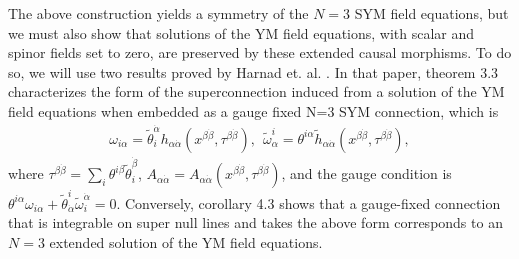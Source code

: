 \documentclass[12pt]{article}
\begin{document}
The above construction yields a symmetry of the $N=3$ SYM field equations, but we must also show that solutions of the YM field equations, with scalar and spinor fields set to zero, are preserved by these extended causal morphisms.  To do so, we will use two results proved by Harnad et. al.  \cite{harnad1989supersymmetric}.  In that paper, theorem 3.3 characterizes the form of the superconnection induced from a solution of the YM field equations when embedded as a gauge fixed N=3 SYM connection, which is 
\begin{align}\label{eq:nextcon}
\omega_{i\alpha}=\tilde{\theta}_i^{\dot{\alpha}}h_{\alpha\dot{\alpha}}(x^{\beta\dot{\beta}},\tau^{\beta\dot{\beta}}), \ \
\tilde{\omega}^i_{\alpha}=\theta^{i\alpha}\tilde{h}_{\alpha\dot{\alpha}}(x^{\beta\dot{\beta}},\tau^{\beta\dot{\beta}}), 
\end{align}
where $\tau^{\beta\dot{\beta}}=\sum_i \theta^{i\beta}\tilde{\theta}^{\dot{\beta}}_i$, $A_{\alpha\dot{\alpha}}=A_{\alpha\dot{\alpha}}(x^{\beta\dot{\beta}},\tau^{\beta\dot{\beta}})$, and the gauge condition is $\theta^{i\alpha}\omega_{i\alpha}+\tilde{\theta}^i_{\dot{\alpha}}\tilde{\omega}_i^{\dot{\alpha}}=0$.  Conversely, corollary 4.3 shows that a gauge-fixed connection that is integrable on super null lines and takes the above form corresponds to an $N=3$ extended solution of the YM field equations.  
\end{document}
